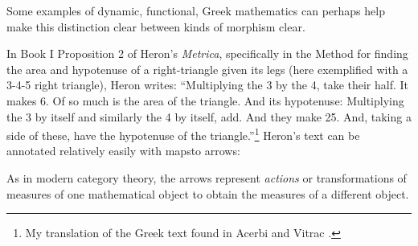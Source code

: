 \documentclass[11pt]{article}
\begin{document}
Some examples of dynamic, functional, Greek mathematics can perhaps help make this distinction clear between kinds of morphism clear.

In Book I Proposition 2 of Heron's \textit{Metrica}, specifically in the Method for finding the area and hypotenuse of a right-triangle given its legs (here exemplified with a 3-4-5 right triangle), Heron writes: ``Multiplying the 3 by the 4, take their half. It makes 6. Of so much is the area of the triangle. And its hypotenuse: Multiplying the 3 by itself and similarly the 4 by itself, add. And they make 25. And, taking a side of these, have the hypotenuse of the triangle.''\footnote{My translation of the Greek text found in Acerbi and Vitrac \protect\citep{acerbi-vitrac2014}.} Heron's text can be annotated relatively easily with mapsto arrows:


As in modern category theory, the arrows represent \textit{actions} or transformations of measures of one mathematical object to obtain the measures of a different object.
\end{document}
